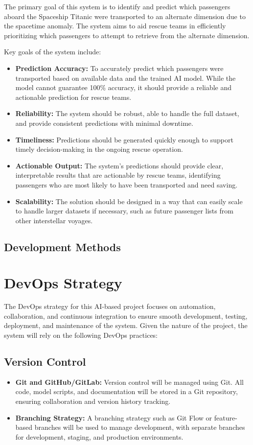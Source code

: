 \documentclass[15pt]{article}
\begin{document}
The primary goal of this system is to identify and predict which passengers aboard the Spaceship Titanic were transported to an alternate dimension due to the spacetime anomaly. The system aims to aid rescue teams in efficiently prioritizing which passengers to attempt to retrieve from the alternate dimension.

Key goals of the system include:

\begin{itemize}
    \item \textbf{Prediction Accuracy:} To accurately predict which passengers were transported based on available data and the trained AI model. While the model cannot guarantee 100\% accuracy, it should provide a reliable and actionable prediction for rescue teams.
    \item \textbf{Reliability:} The system should be robust, able to handle the full dataset, and provide consistent predictions with minimal downtime.
    \item \textbf{Timeliness:} Predictions should be generated quickly enough to support timely decision-making in the ongoing rescue operation.
    \item \textbf{Actionable Output:} The system’s predictions should provide clear, interpretable results that are actionable by rescue teams, identifying passengers who are most likely to have been transported and need saving.
    \item \textbf{Scalability:} The solution should be designed in a way that can easily scale to handle larger datasets if necessary, such as future passenger lists from other interstellar voyages.
\end{itemize}

\subsection{Development Methods}
\section{DevOps Strategy}

The DevOps strategy for this AI-based project focuses on automation, collaboration, and continuous integration to ensure smooth development, testing, deployment, and maintenance of the system. Given the nature of the project, the system will rely on the following DevOps practices:

\subsection{Version Control}
\begin{itemize}
    \item \textbf{Git and GitHub/GitLab:} Version control will be managed using Git. All code, model scripts, and documentation will be stored in a Git repository, ensuring collaboration and version history tracking.
    \item \textbf{Branching Strategy:} A branching strategy such as Git Flow or feature-based branches will be used to manage development, with separate branches for development, staging, and production environments.
\end{itemize}
\end{document}
